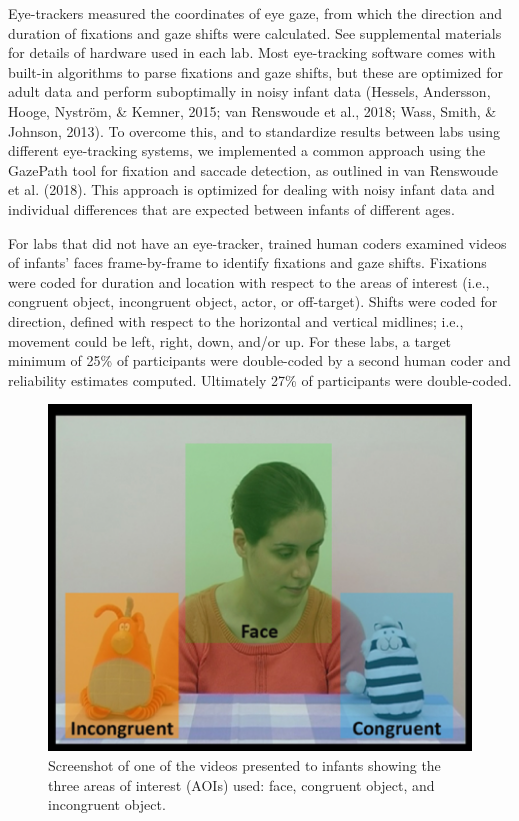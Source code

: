 \documentclass[,man,floatsintext]{apa6}
\begin{document}
Eye-trackers measured the coordinates of eye gaze, from which the direction and duration of fixations and gaze shifts were calculated. See supplemental materials for details of hardware used in each lab. Most eye-tracking software comes with built-in algorithms to parse fixations and gaze shifts, but these are optimized for adult data and perform suboptimally in noisy infant data (Hessels, Andersson, Hooge, Nyström, \& Kemner, 2015; van Renswoude et al., 2018; Wass, Smith, \& Johnson, 2013). To overcome this, and to standardize results between labs using different eye-tracking systems, we implemented a common approach using the GazePath tool for fixation and saccade detection, as outlined in van Renswoude et al. (2018). This approach is optimized for dealing with noisy infant data and individual differences that are expected between infants of different ages.

For labs that did not have an eye-tracker, trained human coders examined videos of infants' faces frame-by-frame to identify fixations and gaze shifts. Fixations were coded for duration and location with respect to the areas of interest (i.e., congruent object, incongruent object, actor, or off-target). Shifts were coded for direction, defined with respect to the horizontal and vertical midlines; i.e., movement could be left, right, down, and/or up. For these labs, a target minimum of 25\% of participants were double-coded by a second human coder and reliability estimates computed. Ultimately 27\% of participants were double-coded.

\begin{figure}
\centering
\includegraphics{Figure1}
\caption{\label{fig:fig1}Screenshot of one of the videos presented to infants showing the three areas of interest (AOIs) used: face, congruent object, and incongruent object.}
\end{figure}
\end{document}

